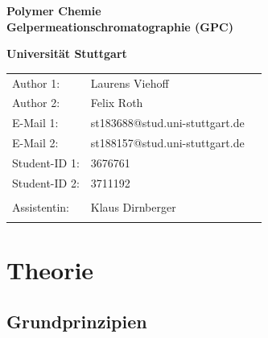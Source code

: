 \documentclass[10pt,a4paper,ngerman]{scrartcl}
\begin{document}
\begin{titlepage}
	\vspace*{2,5cm}
	\begin{center}
		\begin{LARGE}
			\textbf{Polymer Chemie}\\
			\textbf{Gelpermeationschromatographie (GPC)}\\
		\end{LARGE}
		\vspace{1cm}
		\textbf{Universität Stuttgart}\\
		\vspace*{1,5cm}
		\begin{tabular}{lp{}l}
			Author 1:     &Laurens Viehoff\\
            Author 2:     &Felix Roth\\   
			E-Mail 1:      &st183688@stud.uni-stuttgart.de\\
            E-Mail 2:      &st188157@stud.uni-stuttgart.de  \\
			Student-ID 1: & 3676761   \\ 
            Student-ID 2: & 3711192 \\ \\
			Assistentin:  & Klaus Dirnberger  \\ \\ 
		\end{tabular}
	\end{center}

    
\end{titlepage}
\thispagestyle{empty}
\renewcommand{\thepage}{\arabic{page}}
\newpage
\tableofcontents
\setcounter{page}{1}
\renewcommand{\thepage}{\arabic{page}}
\newpage

\section{Theorie}

	\subsection{Grundprinzipien}
		
\end{document}
